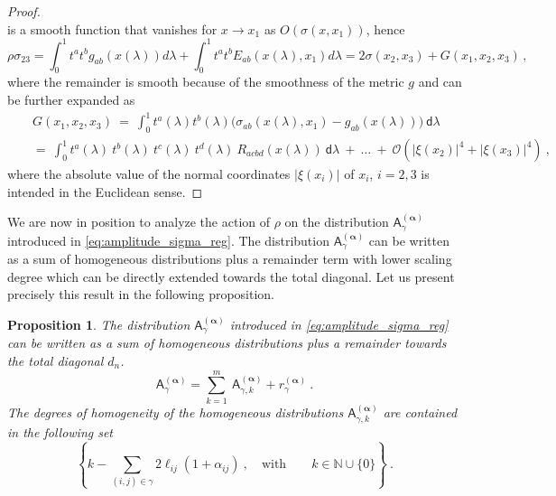 \documentclass[11pt]{book}
\newcommand{\alphabd}{\boldsymbol{\alpha}}
\newcommand{\abs}[1]{\left|#1\right|}
\newcommand{\Ocal}{\mathcal{O}}
\newcommand{\Nbb}{\mathbb{N}}
\newcommand{\Asf}{\mathsf{A}}
\newcommand{\dsf}{\mathsf{d}}
\theoremstyle{break}
\newtheorem{proposition}{Proposition}[chapter]
\begin{document}
\begin{proof}
\begin{equation*}
\end{equation*}
%
is a smooth function that vanishes for $x\to x_1$ as $O(\sigma(x,x_1))$, hence
%
\begin{equation*}
\rho\sigma_{23}  = \int_{0}^{1} t^a t^b g_{ab}(x(\lambda))    d\lambda +  \int_{0}^{1} t^a t^b E_{ab}(x(\lambda),x_1)    d\lambda  = 2\sigma(x_2,x_3) + G(x_1,x_2,x_3)\,,
\end{equation*}
%
where the remainder is smooth because of the smoothness of the metric $g$ and can be further expanded as 
%
\begin{eqnarray}
&& G(x_1,x_2,x_3) \ = \ 
\int_{0}^{1} t^a(\lambda) t^b(\lambda) \bigg( \sigma_{ab}\left(x(\lambda),x_1\right) - g_{ab}\left(x(\lambda)\right) \bigg) \ \dsf\lambda
\label{eq:remainder_sigma}
\\ 
&& = \ \int_{0}^{1} t^a(\lambda) \ t^b(\lambda) \ t^c(\lambda) \ t^d(\lambda) \ R_{acbd}\left(x(\lambda)\right) \ \dsf\lambda \ + \ \dots \ + \ \Ocal\left(\abs{\xi(x_2)}^4 + \abs{\xi(x_3)}^4\right) \ , \nonumber
\end{eqnarray}
where the absolute value of the normal coordinates $|\xi(x_i)|$ of $x_i$, $i=2,3$ is intended in the Euclidean sense.
\end{proof}



We are now in position to analyze the action of $\rho$ on the distribution $\Asf_\gamma^{(\alphabd)}$ introduced in \eqref{eq:amplitude_sigma_reg}. The distribution $\Asf_\gamma^{(\alphabd)}$ can be written as a sum of homogeneous distributions plus a remainder term with lower scaling degree which can be directly extended towards the total diagonal. Let us present precisely this result in the following proposition.


\begin{proposition}\label{prop:almost_homo}
The distribution $\Asf_\gamma^{(\alphabd)}$ introduced in \eqref{eq:amplitude_sigma_reg} can be written as a sum of homogeneous distributions plus a remainder towards the total diagonal $d_n$.
%
\begin{equation*}
\Asf_\gamma^{(\alphabd)} = \sum_{k=1}^m \ \Asf_{\gamma,k}^{(\alphabd)} + r_\gamma^{(\alphabd)} \ .
\end{equation*}
%
The degrees of homogeneity of the homogeneous distributions $\Asf_{\gamma,k}^{(\alphabd)}$ are contained in the following set
%
\begin{equation}
\left\{k-\sum_{(i,j)\in\gamma} 2 \ell_{ij}(1+ \alpha_{ij}) \ , \quad \mbox{with} \qquad k \in \Nbb \cup \{0\} \right\} \ .
\label{eq:deg_homo_ak}
\end{equation}
%
\end{proposition}
\end{document}
